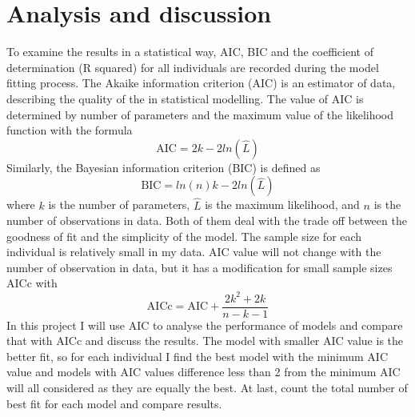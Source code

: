 \documentclass{article}[11pt,a4,twosided,doublespacing,titlepagenumber=on,numbers=endperiod]
\begin{document}
\section{Analysis and discussion}
To examine the results in a statistical way, AIC, BIC and the coefficient of determination (R squared) for all individuals are recorded during the model fitting process. The Akaike information criterion (AIC) is an estimator of data, describing the quality of the in statistical modelling\cite{sakamoto1986akaike}. The value of AIC is determined by number of parameters and the maximum value of the likelihood function with the formula
\begin{equation}
    \text{AIC} = 2k - 2 ln(\widehat{L}) 
\end{equation}
\noindent
Similarly, the Bayesian information criterion (BIC)\cite{chen1998speaker} is defined as
\begin{equation}
    \text{BIC} = ln(n)k - 2 ln(\widehat{L}) 
\end{equation}
where $k$ is the number of parameters, $\widehat{L}$ is the maximum likelihood, and $n$ is the number of observations in data. Both of them deal with the trade off between the goodness of fit and the simplicity of the model. The sample size for each individual is relatively small in my data. AIC value will not change with the number of observation in data, but it has a modification for small sample sizes AICc with
\begin{equation}
    \text{AICc} = \text{AIC} + \frac{2k^2 + 2k}{n - k -1}
\end{equation}
In this project I will use AIC to analyse the performance of models and compare that with AICc and discuss the results. The model with smaller AIC value is the better fit, so for each individual I find the best model with the minimum AIC value and models with AIC values difference less than 2 from the minimum AIC will all considered as they are equally the best. At last, count the total number of best fit for each model and compare results.
\end{document}
